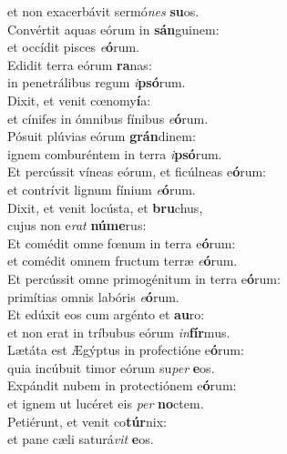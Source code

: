\oddverse et non exacerbávit sermó\textit{nes} \textbf{su}os.\\
\evenverse Convértit aquas eórum in \textbf{sán}guinem:~\*\\
\evenverse et occídit pisces \textit{e}\textbf{ó}rum.\\
\oddverse Edidit terra eórum \textbf{ra}nas:~\*\\
\oddverse in penetrálibus regum \textit{i}\textbf{psó}rum.\\
\evenverse Dixit, et venit cœnomy\textbf{í}a:~\*\\
\evenverse et cínifes in ómnibus fínibus \textit{e}\textbf{ó}rum.\\
\oddverse Pósuit plúvias eórum \textbf{grán}dinem:~\*\\
\oddverse ignem comburéntem in terra \textit{i}\textbf{psó}rum.\\
\evenverse Et percússit víneas eórum, et ficúlneas e\textbf{ó}rum:~\*\\
\evenverse et contrívit lignum fínium \textit{e}\textbf{ó}rum.\\
\oddverse Dixit, et venit locústa, et \textbf{bru}chus,~\*\\
\oddverse cujus non e\textit{rat} \textbf{nú}\textbf{me}rus:\\
\evenverse Et comédit omne fœnum in terra e\textbf{ó}rum:~\*\\
\evenverse et comédit omnem fructum terræ \textit{e}\textbf{ó}rum.\\
\oddverse Et percússit omne primogénitum in terra e\textbf{ó}rum:~\*\\
\oddverse primítias omnis labóris \textit{e}\textbf{ó}rum.\\
\evenverse Et edúxit eos cum argénto et \textbf{au}ro:~\*\\
\evenverse et non erat in tríbubus eórum \textit{in}\textbf{fír}mus.\\
\oddverse Lætáta est Ægýptus in profectióne e\textbf{ó}rum:~\*\\
\oddverse quia incúbuit timor eórum su\textit{per} \textbf{e}os.\\
\evenverse Expándit nubem in protectiónem e\textbf{ó}rum:~\*\\
\evenverse et ignem ut lucéret eis \textit{per} \textbf{no}ctem.\\
\oddverse Petiérunt, et venit co\textbf{túr}nix:~\*\\
\oddverse et pane cæli saturá\textit{vit} \textbf{e}os.\\
